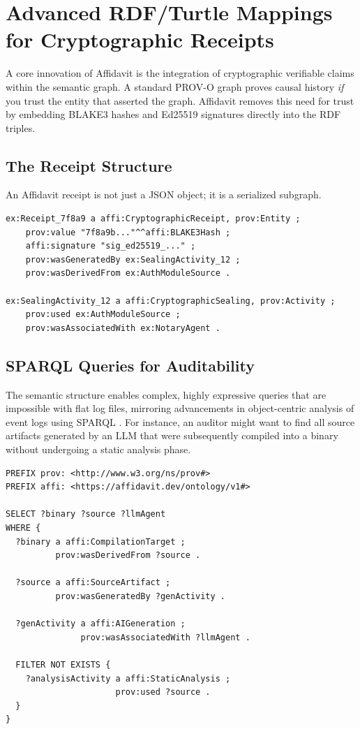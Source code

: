 \section{Advanced RDF/Turtle Mappings for Cryptographic Receipts}

A core innovation of Affidavit is the integration of cryptographic verifiable claims within the semantic graph. A standard PROV-O graph proves causal history \textit{if} you trust the entity that asserted the graph. Affidavit removes this need for trust by embedding BLAKE3 hashes and Ed25519 signatures directly into the RDF triples.

\subsection{The Receipt Structure}

An Affidavit receipt is not just a JSON object; it is a serialized subgraph.

\begin{verbatim}
ex:Receipt_7f8a9 a affi:CryptographicReceipt, prov:Entity ;
    prov:value "7f8a9b..."^^affi:BLAKE3Hash ;
    affi:signature "sig_ed25519_..." ;
    prov:wasGeneratedBy ex:SealingActivity_12 ;
    prov:wasDerivedFrom ex:AuthModuleSource .

ex:SealingActivity_12 a affi:CryptographicSealing, prov:Activity ;
    prov:used ex:AuthModuleSource ;
    prov:wasAssociatedWith ex:NotaryAgent .
\end{verbatim}

\subsection{SPARQL Queries for Auditability}

The semantic structure enables complex, highly expressive queries that are impossible with flat log files, mirroring advancements in object-centric analysis of event logs using SPARQL \cite{ref_ObjectCentricAn31}. For instance, an auditor might want to find all source artifacts generated by an LLM that were subsequently compiled into a binary without undergoing a static analysis phase.

\begin{verbatim}
PREFIX prov: <http://www.w3.org/ns/prov#>
PREFIX affi: <https://affidavit.dev/ontology/v1#>

SELECT ?binary ?source ?llmAgent
WHERE {
  ?binary a affi:CompilationTarget ;
          prov:wasDerivedFrom ?source .
          
  ?source a affi:SourceArtifact ;
          prov:wasGeneratedBy ?genActivity .
          
  ?genActivity a affi:AIGeneration ;
               prov:wasAssociatedWith ?llmAgent .
               
  FILTER NOT EXISTS {
    ?analysisActivity a affi:StaticAnalysis ;
                      prov:used ?source .
  }
}
\end{verbatim}

